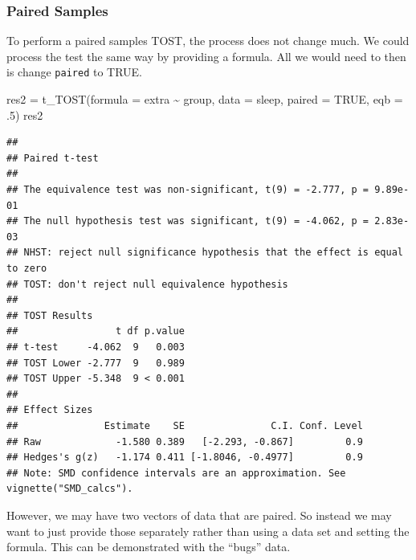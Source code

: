 \documentclass[]{interact}
\theoremstyle{plain}%
\theoremstyle{definition}
\theoremstyle{remark}
\newenvironment{Shaded}{\begin{snugshade}}{\end{snugshade}}
\newcommand{\AttributeTok}[1]{\textcolor[rgb]{0.77,0.63,0.00}{#1}}
\newcommand{\ConstantTok}[1]{\textcolor[rgb]{0.00,0.00,0.00}{#1}}
\newcommand{\DecValTok}[1]{\textcolor[rgb]{0.00,0.00,0.81}{#1}}
\newcommand{\FunctionTok}[1]{\textcolor[rgb]{0.00,0.00,0.00}{#1}}
\newcommand{\NormalTok}[1]{#1}
\newcommand{\OtherTok}[1]{\textcolor[rgb]{0.56,0.35,0.01}{#1}}
\newcommand{\SpecialCharTok}[1]{\textcolor[rgb]{0.00,0.00,0.00}{#1}}
\begin{document}
\newpage

\hypertarget{paired-samples}{%
\subsubsection{Paired Samples}\label{paired-samples}}

To perform a paired samples TOST, the process does not change much. We
could process the test the same way by providing a formula. All we would
need to then is change \texttt{paired} to TRUE.

\begin{Shaded}
\begin{Highlighting}[]
\NormalTok{res2 }\OtherTok{=} \FunctionTok{t\_TOST}\NormalTok{(}\AttributeTok{formula =}\NormalTok{ extra }\SpecialCharTok{\textasciitilde{}}\NormalTok{ group,}
              \AttributeTok{data =}\NormalTok{ sleep,}
              \AttributeTok{paired =} \ConstantTok{TRUE}\NormalTok{,}
              \AttributeTok{eqb =}\NormalTok{ .}\DecValTok{5}\NormalTok{)}
\NormalTok{res2}
\end{Highlighting}
\end{Shaded}

\begin{verbatim}
## 
## Paired t-test
## 
## The equivalence test was non-significant, t(9) = -2.777, p = 9.89e-01
## The null hypothesis test was significant, t(9) = -4.062, p = 2.83e-03
## NHST: reject null significance hypothesis that the effect is equal to zero 
## TOST: don't reject null equivalence hypothesis
## 
## TOST Results 
##                 t df p.value
## t-test     -4.062  9   0.003
## TOST Lower -2.777  9   0.989
## TOST Upper -5.348  9 < 0.001
## 
## Effect Sizes 
##               Estimate    SE               C.I. Conf. Level
## Raw             -1.580 0.389   [-2.293, -0.867]         0.9
## Hedges's g(z)   -1.174 0.411 [-1.8046, -0.4977]         0.9
## Note: SMD confidence intervals are an approximation. See vignette("SMD_calcs").
\end{verbatim}

\newpage

However, we may have two vectors of data that are paired. So instead we
may want to just provide those separately rather than using a data set
and setting the formula. This can be demonstrated with the ``bugs''
data.

\begin{Shaded}
\end{Shaded}
\end{document}
